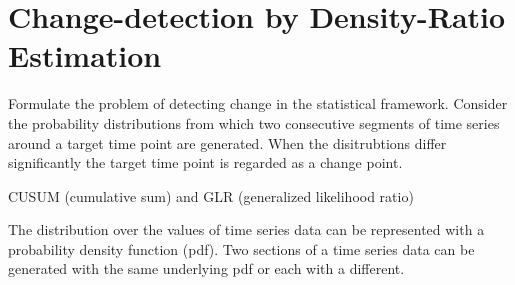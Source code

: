 \section{Change-detection by Density-Ratio Estimation}

Formulate the problem of detecting change in the statistical framework.
Consider the probability distributions from which two consecutive segments of time series around a target time point are generated.
When the disitrubtions differ significantly the target time point is regarded as a change point.




CUSUM (cumulative sum) \cite{basseville1993detection} and GLR (generalized likelihood ratio)


The distribution over the values of time series data can be represented with a probability density function (pdf).
Two sections of a time series data can be generated with the same underlying pdf or each with a different.
